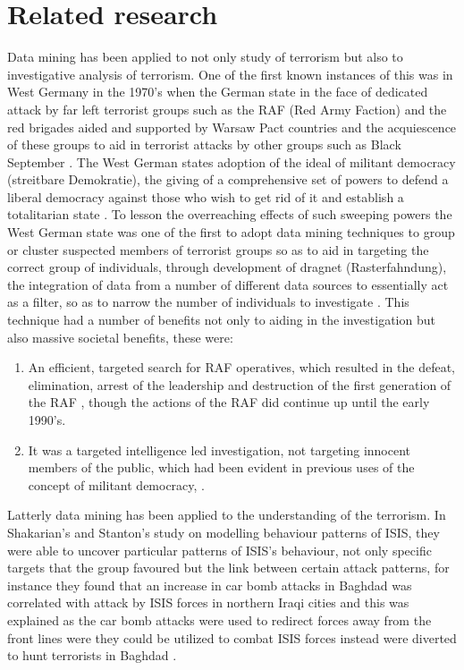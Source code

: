 \documentclass[11pt,twocolumn]{article}
\begin{document}
\section*{\textbf{Related research}}
Data mining has been applied to not only study of terrorism but also to investigative analysis of terrorism. One of the first known instances of this was in West Germany in the 1970's when the German state in the face of dedicated attack by far left terrorist  groups such as the RAF (Red Army Faction) and the red brigades aided and supported by Warsaw Pact countries \citep{leighton2014strange} and the acquiescence of these groups to aid in terrorist attacks by other groups such as Black September
\citep{nacos2016terrorism}. The West German states adoption of the ideal of militant democracy (streitbare Demokratie), the giving of a comprehensive set of powers to defend a liberal democracy against those who wish to get rid of it and establish a totalitarian state \citep{rosenfeld2014militant}. To lesson the overreaching effects of such sweeping powers the West German state was one of the first to adopt data mining techniques to group or cluster suspected members of terrorist groups so as to aid in targeting the correct group of individuals, through development of dragnet (Rasterfahndung), the integration of data from a number of different data sources to essentially act as  a filter, so as to narrow the number of individuals to investigate \citep{weinhauer2014terror}. This technique had a number of benefits not only to aiding in the investigation but also massive societal benefits, these were:
\begin{enumerate}
\item An efficient, targeted search for RAF operatives, which resulted in the defeat, elimination, arrest of the leadership \citep{hauser1997baader} and destruction of the first generation of the RAF \citep{weinhauer2006terrorismus}, though the actions of the RAF did continue up until the early 1990's.
\item It was a targeted intelligence led investigation, not targeting innocent members of the public, which had been evident in previous uses of the concept of militant democracy, \citep{de2010counter}.
\end{enumerate}
Latterly  data mining has been applied to the understanding of the terrorism. In Shakarian's and Stanton's study on modelling behaviour patterns of ISIS, they were able to uncover particular patterns of ISIS's behaviour, not only specific targets that the group favoured but the link between certain attack patterns, for instance they found that an increase in car bomb attacks in Baghdad was correlated with attack by ISIS forces in northern Iraqi cities and this was explained as the car bomb attacks were used to redirect forces away from the front lines were they could be utilized to combat ISIS forces instead were diverted to hunt terrorists in Baghdad \citep{stanton2015mining}.
\end{document}

